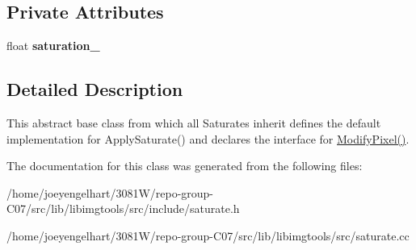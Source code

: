 \subsection*{Private Attributes}
\begin{DoxyCompactItemize}
\item 
float {\bfseries saturation\+\_\+}\hypertarget{classimage__tools_1_1Saturate_a75bcc29104d1e4faec7dc73c1ce9e218}{}\label{classimage__tools_1_1Saturate_a75bcc29104d1e4faec7dc73c1ce9e218}

\end{DoxyCompactItemize}


\subsection{Detailed Description}
This abstract base class from which all Saturates inherit defines the default implementation for Apply\+Saturate() and declares the interface for \hyperlink{classimage__tools_1_1Saturate_a6bfeebbbbfb3e52c6981336bfda55640}{Modify\+Pixel()}. 

The documentation for this class was generated from the following files\+:\begin{DoxyCompactItemize}
\item 
/home/joeyengelhart/3081\+W/repo-\/group-\/\+C07/src/lib/libimgtools/src/include/saturate.\+h\item 
/home/joeyengelhart/3081\+W/repo-\/group-\/\+C07/src/lib/libimgtools/src/saturate.\+cc\end{DoxyCompactItemize}

